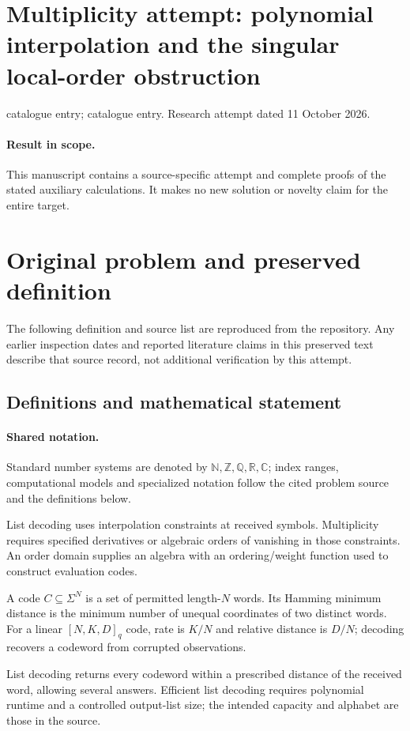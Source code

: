 \documentclass[11pt]{article}
\begin{document}
\section*{Multiplicity attempt: polynomial interpolation and the singular local-order obstruction}
\noindent catalogue entry; catalogue entry. Research attempt dated 11 October 2026.
\paragraph{Result in scope.}This manuscript contains a source-specific attempt and complete proofs of the stated auxiliary calculations. It makes no new solution or novelty claim for the entire target.
\section{Original problem and preserved definition}
The following definition and source list are reproduced from the repository. Any earlier inspection dates and reported literature claims in this preserved text describe that source record, not additional verification by this attempt.
\subsection{Definitions and mathematical statement}

\paragraph{Shared notation.}Standard number systems are denoted by $\mathbb N,\mathbb Z,\mathbb Q,\mathbb R,\mathbb C$; index ranges, computational models and specialized notation follow the cited problem source and the definitions below.


List decoding uses interpolation constraints at received symbols. Multiplicity requires specified derivatives or algebraic orders of vanishing in those constraints. An order domain supplies an algebra with an ordering/weight function used to construct evaluation codes.

A code $C\subseteq\Sigma^N$ is a set of permitted length-$N$ words. Its Hamming minimum distance is the minimum number of unequal coordinates of two distinct words. For a linear $[N,K,D]_q$ code, rate is $K/N$ and relative distance is $D/N$; decoding recovers a codeword from corrupted observations.

List decoding returns every codeword within a prescribed distance of the received word, allowing several answers. Efficient list decoding requires polynomial runtime and a controlled output-list size; the intended capacity and alphabet are those in the source.
\end{document}
